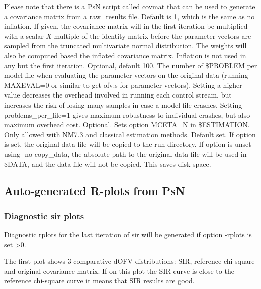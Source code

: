 \begin{optionlist}
Please note that there is a PsN script called covmat that can be used to generate a covariance matrix from a raw\_results file.
\nextopt
{}
Default is 1, which is the same as no inflation. If given, the covariance
matrix will in the first iteration be multiplied with a scalar $X$ multiple of the identity matrix
before the parameter vectors
are sampled from the truncated multivariate normal distribution.
The weights will also be computed based the inflated covariance matrix. 
Inflation is not used in any but the first iteration.
\nextopt
{}
Optional, default 100. The number of \$PROBLEM per model file when evaluating the parameter vectors
on the original data (running
MAXEVAL=0 or similar to get ofv:s for parameter vectors). Setting a higher value
decreases the overhead involved in running each control stream, but increases the 
risk of losing many samples in case a model file crashes. Setting -problems\_per\_file=1
gives maximum robustness to individual crashes, but also maximum overhead cost.
\nextopt
{}
Optional. Sets option MCETA=N in \$ESTIMATION. Only allowed with NM7.3 and classical estimation methods.
\nextopt
{}
Default set. If option is set, the original data file
will be copied to the run directory.
If option is unset using -no-copy\_data, the absolute path to the original data file will be used in
\$DATA, and the data file will not be copied. This saves disk space.
\nextopt
\end{optionlist}

\subsection{Auto-generated R-plots from PsN}
\newcommand{\rplotsconditions}{The default sir template 
requires 
that R libraries
ggplot2, plyr, dplyr, caTools, reshape and tidyr are installed.
If the conditions are not fulfilled then no pdf will be generated,
see the .Rout file in the main run directory for error messages.}


\subsubsection*{Diagnostic sir plots}
Diagnostic rplots for the last iteration of sir will be generated if option -rplots is set >0.

The first plot shows 3 comparative dOFV distributions: SIR, reference chi-square and original covariance matrix.
If on this plot the SIR curve is close to the reference chi-square curve it means that SIR results are good.

